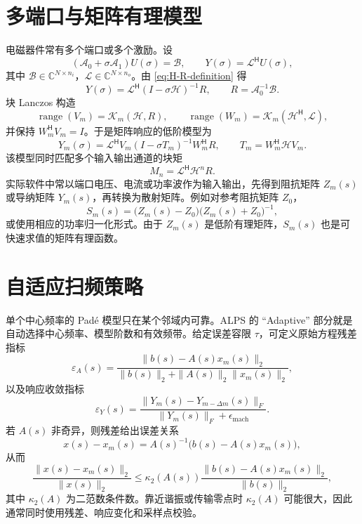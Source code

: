 \documentclass[UTF8,a4paper,11pt]{ctexart}
\newcommand{\CC}{\mathbb{C}}
\newcommand{\cA}{\mathcal{A}}
\newcommand{\cB}{\mathcal{B}}
\newcommand{\cH}{\mathcal{H}}
\newcommand{\cK}{\mathcal{K}}
\newcommand{\cL}{\mathcal{L}}
\newcommand{\herm}{\mathsf{H}}
\begin{document}
\section{多端口与矩阵有理模型}

电磁器件常有多个端口或多个激励。设
\[
    (\cA_0+\sigma\cA_1)U(\sigma)=\cB,\qquad
    Y(\sigma)=\cL^{\herm}U(\sigma),
\]
其中 $\cB\in\CC^{N\times n_i}$，$\cL\in\CC^{N\times n_o}$。由 \eqref{eq:H-R-definition} 得
\begin{equation}
    Y(\sigma)
    =
    \cL^{\herm}(I-\sigma\cH)^{-1}R,
    \qquad R=\cA_0^{-1}\cB .
\end{equation}
块 Lanczos 构造
\[
    \operatorname{range}(V_m)
    =
    \cK_m(\cH,R),
    \qquad
    \operatorname{range}(W_m)
    =
    \cK_m(\cH^{\herm},\cL),
\]
并保持 $W_m^{\herm}V_m=I$。于是矩阵响应的低阶模型为
\begin{equation}
    Y_m(\sigma)
    =
    \cL^{\herm}V_m
    (I-\sigma T_m)^{-1}
    W_m^{\herm}R,
    \qquad
    T_m=W_m^{\herm}\cH V_m .
    \label{eq:block-rom}
\end{equation}
该模型同时匹配多个输入输出通道的块矩
\[
    M_n=\cL^{\herm}\cH^nR .
\]
实际软件中常以端口电压、电流或功率波作为输入输出，先得到阻抗矩阵 $Z_m(s)$ 或导纳矩阵 $Y_m(s)$，再转换为散射矩阵。例如对参考阻抗矩阵 $Z_0$，
\begin{equation}
    S_m(s)
    =
    \bigl(Z_m(s)-Z_0\bigr)
    \bigl(Z_m(s)+Z_0\bigr)^{-1},
    \label{eq:s-param}
\end{equation}
或使用相应的功率归一化形式。由于 $Z_m(s)$ 是低阶有理矩阵，$S_m(s)$ 也是可快速求值的矩阵有理函数。

\section{自适应扫频策略}

单个中心频率的 Padé 模型只在某个邻域内可靠。ALPS 的 ``Adaptive'' 部分就是自动选择中心频率、模型阶数和有效频带。给定误差容限 $\tau$，可定义原始方程残差指标
\begin{equation}
    \varepsilon_A(s)
    =
    \frac{\|b(s)-A(s)x_m(s)\|_2}
         {\|b(s)\|_2+\|A(s)\|_2\|x_m(s)\|_2},
    \label{eq:residual-error}
\end{equation}
以及响应收敛指标
\begin{equation}
    \varepsilon_Y(s)
    =
    \frac{\|Y_m(s)-Y_{m-\Delta m}(s)\|_F}
         {\|Y_m(s)\|_F+\epsilon_{\mathrm{mach}}}.
    \label{eq:response-error}
\end{equation}
若 $A(s)$ 非奇异，则残差给出误差关系
\begin{equation}
    x(s)-x_m(s)=A(s)^{-1}\bigl(b(s)-A(s)x_m(s)\bigr),
\end{equation}
从而
\begin{equation}
    \frac{\|x(s)-x_m(s)\|_2}{\|x(s)\|_2}
    \le
    \kappa_2(A(s))
    \frac{\|b(s)-A(s)x_m(s)\|_2}{\|b(s)\|_2},
    \label{eq:error-bound}
\end{equation}
其中 $\kappa_2(A)$ 为二范数条件数。靠近谐振或传输零点时 $\kappa_2(A)$ 可能很大，因此通常同时使用残差、响应变化和采样点校验。
\end{document}
